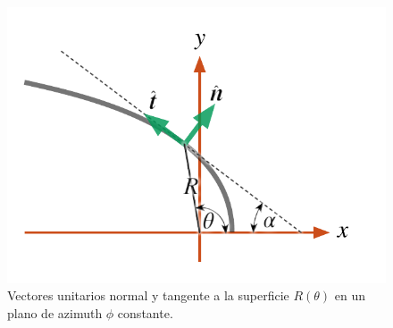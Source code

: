 \begin{figure}
  \centering
  \includegraphics[width=0.6\linewidth]{./Figures/bowshock-unit-vectors}
  \caption[Vectores unitarios normal y tangente a la superficie $R(\theta)$]{Vectores unitarios normal y tangente a la superficie $R(\theta)$
    en un plano de azimuth $\phi$ constante.}
    \label{fig:unit-vec}
\end{figure}

